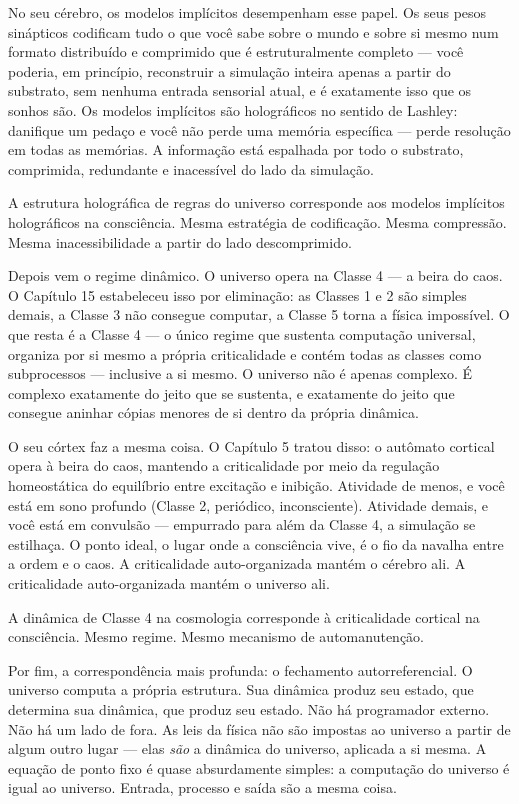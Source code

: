 \documentclass[11pt, twoside, openright]{book}
\begin{document}
No seu cérebro, os modelos implícitos desempenham esse papel. Os seus pesos sinápticos codificam tudo o que você sabe sobre o mundo e sobre si mesmo num formato distribuído e comprimido que é estruturalmente completo --- você poderia, em princípio, reconstruir a simulação inteira apenas a partir do substrato, sem nenhuma entrada sensorial atual, e é exatamente isso que os sonhos são. Os modelos implícitos são holográficos no sentido de Lashley: danifique um pedaço e você não perde uma memória específica --- perde resolução em todas as memórias. A informação está espalhada por todo o substrato, comprimida, redundante e inacessível do lado da simulação.

A estrutura holográfica de regras do universo corresponde aos modelos implícitos holográficos na consciência. Mesma estratégia de codificação. Mesma compressão. Mesma inacessibilidade a partir do lado descomprimido.

Depois vem o regime dinâmico. O universo opera na Classe 4 --- a beira do caos. O Capítulo 15 estabeleceu isso por eliminação: as Classes 1 e 2 são simples demais, a Classe 3 não consegue computar, a Classe 5 torna a física impossível. O que resta é a Classe 4 --- o único regime que sustenta computação universal, organiza por si mesmo a própria criticalidade e contém todas as classes como subprocessos --- inclusive a si mesmo. O universo não é apenas complexo. É complexo exatamente do jeito que se sustenta, e exatamente do jeito que consegue aninhar cópias menores de si dentro da própria dinâmica.

O seu córtex faz a mesma coisa. O Capítulo 5 tratou disso: o autômato cortical opera à beira do caos, mantendo a criticalidade por meio da regulação homeostática do equilíbrio entre excitação e inibição. Atividade de menos, e você está em sono profundo (Classe 2, periódico, inconsciente). Atividade demais, e você está em convulsão --- empurrado para além da Classe 4, a simulação se estilhaça. O ponto ideal, o lugar onde a consciência vive, é o fio da navalha entre a ordem e o caos. A criticalidade auto-organizada mantém o cérebro ali. A criticalidade auto-organizada mantém o universo ali.

A dinâmica de Classe 4 na cosmologia corresponde à criticalidade cortical na consciência. Mesmo regime. Mesmo mecanismo de automanutenção.

Por fim, a correspondência mais profunda: o fechamento autorreferencial. O universo computa a própria estrutura. Sua dinâmica produz seu estado, que determina sua dinâmica, que produz seu estado. Não há programador externo. Não há um lado de fora. As leis da física não são impostas ao universo a partir de algum outro lugar --- elas \textit{são} a dinâmica do universo, aplicada a si mesma. A equação de ponto fixo é quase absurdamente simples: a computação do universo é igual ao universo. Entrada, processo e saída são a mesma coisa.
\end{document}
